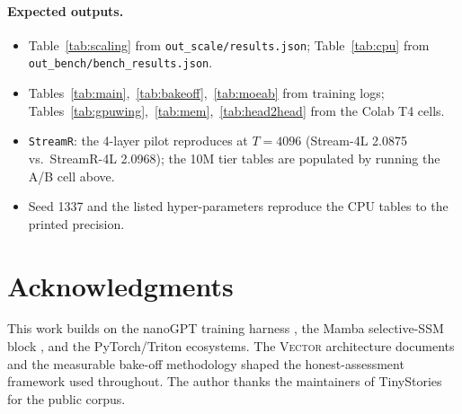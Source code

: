 \documentclass[11pt]{article}
\newcommand{\StreamR}{\texttt{StreamR}}
\newcommand{\Vector}{{\scshape Vector}}
\begin{document}
\paragraph{Expected outputs.}
\begin{itemize}
  \item Table~\ref{tab:scaling} from \texttt{out\_scale/results.json};
        Table~\ref{tab:cpu} from \texttt{out\_bench/bench\_results.json}.
  \item Tables~\ref{tab:main},~\ref{tab:bakeoff},~\ref{tab:moeab} from training
        logs; Tables~\ref{tab:gpuwing},~\ref{tab:mem},~\ref{tab:head2head} from
        the Colab T4 cells.
  \item \StreamR{}: the 4-layer pilot reproduces at $T{=}4096$ (Stream-4L 2.0875
        vs.\ StreamR-4L 2.0968); the 10M tier tables are populated by running
        the A/B cell above.
  \item Seed 1337 and the listed hyper-parameters reproduce the CPU tables to
        the printed precision.
\end{itemize}

\section*{Acknowledgments}

This work builds on the nanoGPT training harness \cite{Karpathy2023nanoGPT}, the
Mamba selective-SSM block \cite{GuDao2023Mamba}, and the PyTorch/Triton
ecosystems. The \Vector{} architecture documents and the measurable bake-off
methodology shaped the honest-assessment framework used throughout. The author
thanks the maintainers of TinyStories \cite{TinyStories} for the public corpus.
\end{document}
